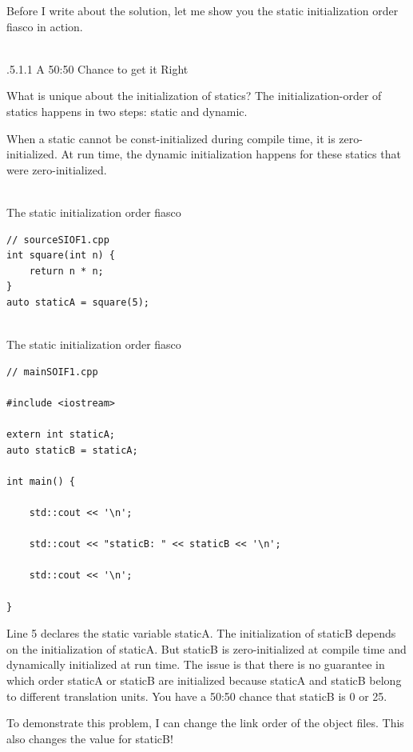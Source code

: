 Before I write about the solution, let me show you the static initialization order fiasco in action.

\hspace*{\fill} \\ %
.5.1.1\hspace{0.2cm} A 50:50 Chance to get it Right

What is unique about the initialization of statics? The initialization-order of statics happens in two steps: static and dynamic.

When a static cannot be const-initialized during compile time, it is zero-initialized. At run time, the dynamic initialization happens for these statics that were zero-initialized.

\hspace*{\fill} \\ %
\noindent
The static initialization order fiasco
\begin{lstlisting}[style=styleCXX]
// sourceSIOF1.cpp
int square(int n) {
	return n * n;
}
auto staticA = square(5);
\end{lstlisting}

\hspace*{\fill} \\ %
\noindent
The static initialization order fiasco
\begin{lstlisting}[style=styleCXX]
// mainSOIF1.cpp

#include <iostream>

extern int staticA;
auto staticB = staticA;

int main() {
	
	std::cout << '\n';
	
	std::cout << "staticB: " << staticB << '\n';
	
	std::cout << '\n';

}
\end{lstlisting}

Line 5 declares the static variable staticA. The initialization of staticB depends on the initialization of staticA. But staticB is zero-initialized at compile time and dynamically initialized at run time. The issue is that there is no guarantee in which order staticA or staticB are initialized because staticA and staticB belong to different translation units. You have a 50:50 chance that staticB is 0 or 25.

To demonstrate this problem, I can change the link order of the object files. This also changes the value for staticB!


